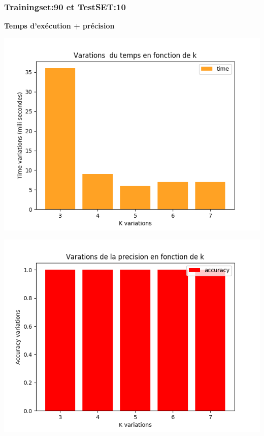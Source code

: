 \documentclass[12pt,a4paper,oneside]{book}
\begin{document}
	\subsubsection{Trainingset:90 et TestSET:10}
	\textbf{Temps d'exécution + précision}\\
	\begin{frame}{}
		\centering
		\begin{minipage}[b]{0.5\linewidth}
			\includegraphics[scale=0.5]{image/labor:Train,90,Test,10time.png}
			\label{labelname}%
		\end{minipage}
		\hspace{0.5cm}
		\begin{minipage}[b]{0.5\linewidth}
			\includegraphics[scale=0.5]{image/labor:Train,80,Test,20:accuracy.png}%
			\label{labelname}%
		\end{minipage}
	\end{frame}
	
\end{document}

